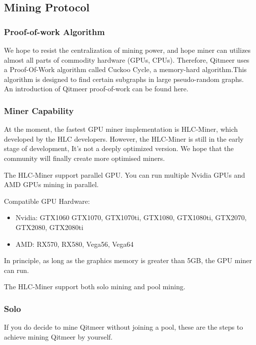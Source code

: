 \documentclass[a4paper,11pt]{article}
\begin{document}
\subsection{Mining Protocol}
\subsubsection{Proof-of-work Algorithm}

We hope to resist the centralization of mining power, and hope miner can utilizes almost all parts of commodity hardware (GPUs, CPUs).
Therefore, Qitmeer uses a Proof-Of-Work algorithm called Cuckoo Cycle\cite{cuckoocycle}, 
a memory-hard algorithm.This algorithm is designed to find certain subgraphs in large pseudo-random graphs. 
An introduction of Qitmeer proof-of-work can be found here.\cite{qitmeerpow} 

\subsubsection{Miner Capability}

At the moment, the fastest GPU miner implementation is HLC-Miner, which developed by the HLC developers. 
However, the HLC-Miner is still in the early stage of development, It's not a deeply optimized version. We hope 
that the community will finally create more optimised miners.

The HLC-Miner support parallel GPU. You can run multiple Nvidia GPUs and AMD GPUs mining in parallel.

Compatible GPU Hardware:

\begin{itemize}
\item Nvidia: GTX1060 GTX1070, GTX1070ti, GTX1080, GTX1080ti, GTX2070, GTX2080, GTX2080ti
\item AMD: RX570, RX580, Vega56, Vega64
\end{itemize}

In principle, as long as the graphics memory is greater than 5GB, the GPU miner can run.

The HLC-Miner support both solo mining and pool mining. 

\subsubsection*{Solo}
If you do decide to mine Qitmeer without joining a pool, these are the steps to achieve mining Qitmeer by yourself.
\end{document}
